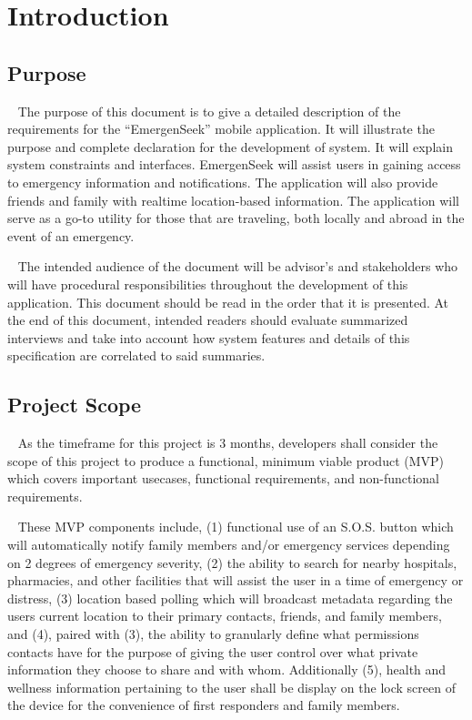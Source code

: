 \documentclass{scrreprt}
\begin{document}
\chapter{Introduction}


\section{Purpose}
\par ~ The purpose of this document is to give a detailed description of the requirements for the ``EmergenSeek'' mobile application. It will illustrate the purpose and complete declaration for the development of system. It will explain system constraints and interfaces. EmergenSeek will assist users in gaining access to emergency information and notifications. The application will also provide friends and family with realtime location-based information. The application will serve as a go-to utility for those that are traveling, both locally and abroad in the event of an emergency.
\par ~ The intended audience of the document will be advisor's and stakeholders who will have procedural responsibilities throughout the development of this application. This document should be read in the order that it is presented. At the end of this document, intended readers should evaluate summarized interviews and take into account how system features and details of this specification are correlated to said summaries.


\section{Project Scope}
\par ~ As the timeframe for this project is 3 months, developers shall consider the scope of this project to produce a functional, minimum viable product (MVP) which covers important usecases, functional requirements, and non-functional requirements. 

\par ~ These MVP components include, (1) functional use of an S.O.S. button which will automatically notify family members and/or emergency services depending on 2 degrees of emergency severity, (2) the ability to search for nearby hospitals, pharmacies, and other facilities that will assist the user in a time of emergency or distress, (3) location based polling which will broadcast metadata regarding the users current location to their primary contacts, friends, and family members, and (4), paired with (3), the ability to granularly define what permissions contacts have for the purpose of giving the user control over what private information they choose to share and with whom. Additionally (5), health and wellness information pertaining to the user shall be display on the lock screen of the device for the convenience of first responders and family members.
\end{document}
